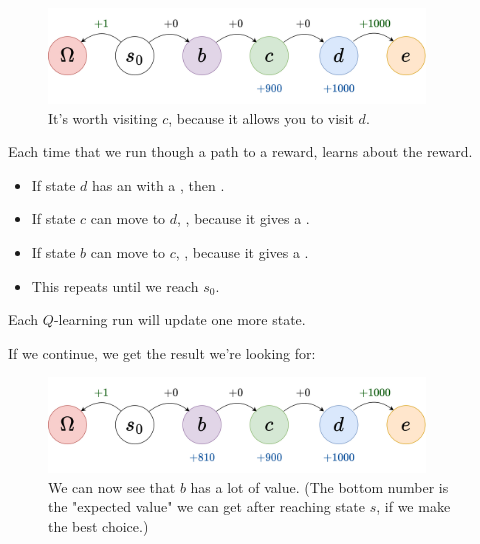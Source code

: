         \begin{figure}[H]
            \centering
            \includegraphics[width=100mm,scale=0.5]{images/rl_images/hallway_c.png}
            \caption*{It's worth visiting $c$, because it allows you to visit $d$.}
        \end{figure}

        \begin{concept}
            Each time that we run though a path to a reward,  learns about the reward.

            \begin{itemize}
                \item If state $d$ has an  with a , then .
                \item If state $c$ can move to $d$, , because it gives a .
                \item If state $b$ can move to $c$, , because it gives a .
                \item This repeats until we reach $s_0$.
            \end{itemize}

            Each $Q$-learning run will update one more state.
        \end{concept}

        If we continue, we get the result we're looking for:

        \begin{figure}[H]
            \centering
            \includegraphics[width=100mm,scale=0.5]{images/rl_images/hallway_b.png}
            \caption*{We can now see that $b$ has a lot of value. (The bottom number is the "expected value" we can get after reaching state $s$, if we make the best choice.)}
        \end{figure}

